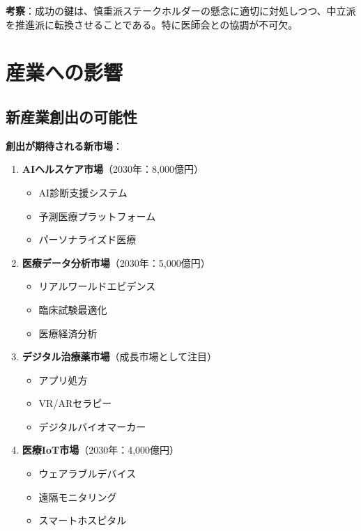 \documentclass[
  a4paper,
  a4paper,
  11pt]{ltjsbook}
\providecommand{\tightlist}{%
  \setlength{\itemsep}{0pt}\setlength{\parskip}{0pt}}
\begin{document}
\textbf{考察}：成功の鍵は、慎重派ステークホルダーの懸念に適切に対処しつつ、中立派を推進派に転換させることである。特に医師会との協調が不可欠。

\section{産業への影響}\label{ux7523ux696dux3078ux306eux5f71ux97ff}

\subsection{新産業創出の可能性}\label{ux65b0ux7523ux696dux5275ux51faux306eux53efux80fdux6027}

\textbf{創出が期待される新市場}：

\begin{enumerate}
\def\labelenumi{\arabic{enumi}.}
\tightlist
\item
  \textbf{AIヘルスケア市場}（2030年：8,000億円）

  \begin{itemize}
  \tightlist
  \item
    AI診断支援システム
  \item
    予測医療プラットフォーム
  \item
    パーソナライズド医療
  \end{itemize}
\item
  \textbf{医療データ分析市場}（2030年：5,000億円）

  \begin{itemize}
  \tightlist
  \item
    リアルワールドエビデンス
  \item
    臨床試験最適化
  \item
    医療経済分析
  \end{itemize}
\item
  \textbf{デジタル治療薬市場}（成長市場として注目）

  \begin{itemize}
  \tightlist
  \item
    アプリ処方
  \item
    VR/ARセラピー
  \item
    デジタルバイオマーカー
  \end{itemize}
\item
  \textbf{医療IoT市場}（2030年：4,000億円）

  \begin{itemize}
  \tightlist
  \item
    ウェアラブルデバイス
  \item
    遠隔モニタリング
  \item
    スマートホスピタル
  \end{itemize}
\end{enumerate}
\end{document}
